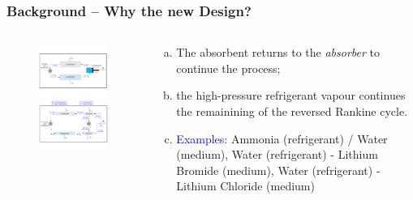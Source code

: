 \documentclass[10pt,compress]{beamer}
\begin{document}
\begin{frame}
 \frametitle{Background -- Why the new Design?}
  \begin{columns}
   \begin{column}[c]{0.45\linewidth}
    \begin{figure}%
     \vbox{
      \includegraphics[width=5.5cm,clip]{./Pics/Overview_Refrig31}
      \vspace{-.5cm}
      \includegraphics[width=5.5cm,clip]{./Pics/Overview_Refrig32}}
    \end{figure}  
   \end{column}  
   \begin{column}[c]{0.55\linewidth}
  \begin{enumerate}[(a)]
   \item <1-> The absorbent returns to the {\it absorber} to continue the process;
   \item <2-> the high-pressure refrigerant vapour continues the remainining of the reversed Rankine cycle. 
   \item <3-> \textcolor{blue}{Examples:} Ammonia (refrigerant) / Water (medium), Water (refrigerant) - Lithium Bromide (medium), Water (refrigerant) - Lithium Chloride (medium)
  \end{enumerate}
   \end{column}  
 \end{columns}  
\end{frame}
\end{document}
